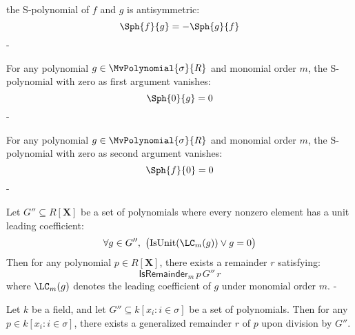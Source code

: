 \begin{lemma}\label{MonomialOrder.sPolynomial_antisymm}
  \leanok
  the S-polynomial of $f$ and $g$ is antisymmetric:
\[
\Sph{f}{g} = -\Sph{g}{f}
\]
-
\end{lemma}

\begin{lemma}\label{MonomialOrder.sPolynomial_eq_zero_of_left_eq_zero}
  \leanok
  For any polynomial $g \in \MvPolynomial{\sigma}{R}$ and monomial order $m$,
the S-polynomial with zero as first argument vanishes:
\[
\Sph{0}{g} = 0
\]
-
\end{lemma}

\begin{lemma}\label{MonomialOrder.sPolynomial_eq_zero_of_right_eq_zero'}
  \leanok
  For any polynomial $g \in \MvPolynomial{\sigma}{R}$ and monomial order $m$,
the S-polynomial with zero as second argument vanishes:
\[
\Sph{f}{0} = 0
\]
-
\end{lemma}

\begin{lemma}\label{MonomialOrder.div_set'}
  \leanok
  Let $G'' \subseteq R[\mathbf{X}]$ be a set of polynomials where every nonzero element has a unit leading coefficient:
\[
\forall g \in G'',\ \big(\mathrm{IsUnit}(\LC_m(g)) \lor g = 0\big)
\]
Then for any polynomial $p \in R[\mathbf{X}]$, there exists a remainder $r$ satisfying:
\[
\mathsf{IsRemainder}_m\,p\,G''\,r
\]
where $\LC_m(g)$ denotes the leading coefficient of $g$ under monomial order $m$.
-
\end{lemma}

\begin{lemma}\label{MonomialOrder.div_set''}
  \leanok
  Let \( k \) be a field, and let \( G'' \subseteq k[x_i : i \in \sigma] \) be a set of polynomials.
Then for any \( p \in k[x_i : i \in \sigma] \), there exists a generalized remainder \( r \) of \( p \) upon division by \( G'' \).

\end{lemma}

